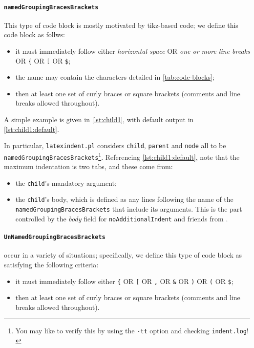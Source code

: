 	\paragraph{\texttt{namedGroupingBracesBrackets}}
		This type of code block is mostly motivated by tikz-based code; we define this code block as follws:
		\begin{itemize}
			\item it must immediately follow either \emph{horizontal space} OR \emph{one or more line breaks} OR \lstinline!{! OR \lstinline![!
			      OR \lstinline!$!;
			\item the name may contain the characters detailed in \vref{tab:code-blocks};
			\item then at least one set of curly braces or square brackets (comments and line breaks allowed throughout).
		\end{itemize}
		A simple example is given in \cref{lst:child1}, with default output in \cref{lst:child1:default}.

		\begin{minipage}{.45\textwidth}
		\end{minipage}%
		\hfill
		\begin{minipage}{.5\textwidth}
		\end{minipage}%

		In particular, \texttt{latexindent.pl} considers \texttt{child}, \texttt{parent} and \texttt{node} all to be \texttt{namedGroupingBracesBrackets}\footnote{
			You may like to verify this by using the \texttt{-tt} option and checking \texttt{indent.log}! }.
		Referencing \cref{lst:child1:default},
		note that the maximum indentation is two tabs, and these come from:
		\begin{itemize}
			\item the \lstinline!child!'s mandatory argument;
			\item the \lstinline!child!'s body, which is defined as any lines following the name of the \texttt{namedGroupingBracesBrackets}
			      that include its arguments. This is the part controlled by the \emph{body} field for \texttt{noAdditionalIndent}
			      and friends from .
		\end{itemize}

	\paragraph{\texttt{UnNamedGroupingBracesBrackets}} occur in a variety of situations; specifically, we define
		this type of code block as satisfying the following criteria:
		\begin{itemize}
			\item it must immediately follow either \lstinline!{! OR \lstinline![! OR \lstinline!,! OR \lstinline!&! OR \lstinline!)! OR \lstinline!(!
			      OR \lstinline!$!;
			\item then at least one set of curly braces or square brackets (comments and line breaks allowed throughout).
		\end{itemize}


